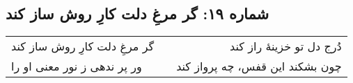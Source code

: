 \begin{center}
\section*{شماره ۱۹: گر مرغِ دلت کارِ روش ساز کند}
\label{sec:019}
\begin{longtable}{l p{0.5cm} r}
گر مرغِ دلت کارِ روش ساز کند
&&
دُرج دل تو خزینهٔ راز کند
\\
ور پر ندهی ز نور معنی او را
&&
چون بشکند این قفس، چه پرواز کند
\\
\end{longtable}
\end{center}
